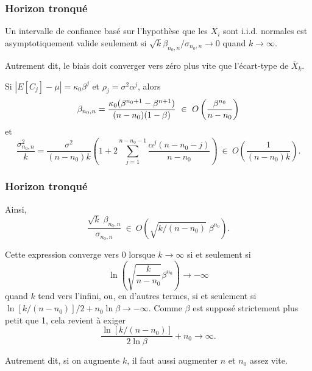 \documentclass[t,usepdftitle=false]{beamer}
\def\iid{i.i.d.}
\begin{document}
\begin{frame}
\frametitle{Horizon tronqué}

Un intervalle de confiance basé sur l'hypothèse que les $X_i$ sont \iid{} normales est asymptotiquement valide seulement si
$\sqrt{k}\beta_{n_0,n} / \sigma_{n_0,n}\to 0$ quand $k\to\infty$.

\mbox{}

Autrement dit, le biais doit converger vers zéro plus vite que 
l'écart-type de $\bar X_k$.

\mbox{}

Si $|E[C_j] - \mu| = \kappa_0 \beta^j$ et $\rho_j = \sigma^2\alpha^j$,
alors
\[
 \beta_{n_0,n} = 
 {\kappa_0(\beta^{n_0+1}-\beta^{n+1}) \over (n-n_0)(1-\beta)}
 ~\in~ O\left(\frac{\beta^{n_0}}{n-n_0}\right)
\]
et
\[
  \frac{\sigma_{n_0,n}^2}{k} 
 = \frac{\sigma^2}{(n-n_0)k} 
   \left(1+2\sum_{j=1}^{n-n_0-1} \frac{\alpha^j(n-n_0-j)}{n-n_0}\right)
 ~\in~ O\left(\frac{1}{(n-n_0)k}\right).
\]

\end{frame}

\begin{frame}
\frametitle{Horizon tronqué}

Ainsi,
\[
  \frac{\sqrt{k}\;\beta_{n_0,n}}{\sigma_{n_0,n}} 
  ~\in~ O\left(\sqrt{k/(n-n_0)}\; \beta^{n_0}\right).
\]

\mbox{}

Cette expression converge vers $0$ lorsque $k\to\infty$ si et seulement si 
\[
\ln \left( \sqrt{\frac{k}{n-n_0}}\beta^{n_0}\right) \rightarrow -\infty
\]
quand $k$ tend vers l'infini, ou, en d'autres termes, si et seulement si
$\ln[k/(n-n_0)]/2 + n_0 \ln \beta \to -\infty$. Comme $\beta$ est
supposé strictement plus petit que 1, cela revient à exiger
\[
  \frac{\ln[k/(n-n_0)]}{2\ln\beta} + n_0 \to \infty.
\]

\mbox{}

Autrement dit, si on augmente $k$, il faut aussi augmenter $n$ et
$n_0$ assez vite.

\end{frame}
\end{document}
